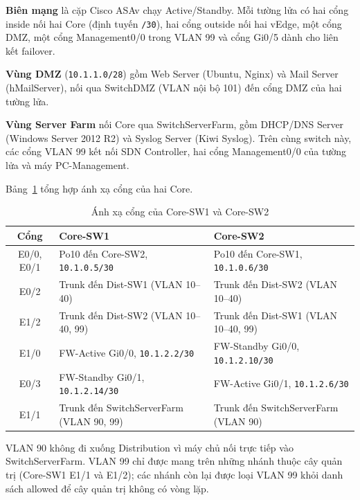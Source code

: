 \textbf{Biên mạng} là cặp Cisco ASAv chạy Active/Standby. Mỗi tường lửa có hai cổng inside nối hai Core (định tuyến \texttt{/30}), hai cổng outside nối hai vEdge, một cổng DMZ, một cổng Management0/0 trong VLAN 99 và cổng Gi0/5 dành cho liên kết failover.

\textbf{Vùng DMZ} (\texttt{10.1.1.0/28}) gồm Web Server (Ubuntu, Nginx) và Mail Server (hMailServer), nối qua SwitchDMZ (VLAN nội bộ 101) đến cổng DMZ của hai tường lửa.

\textbf{Vùng Server Farm} nối Core qua SwitchServerFarm, gồm DHCP/DNS Server (Windows Server 2012 R2) và Syslog Server (Kiwi Syslog). Trên cùng switch này, các cổng VLAN 99 kết nối SDN Controller, hai cổng Management0/0 của tường lửa và máy PC-Management.

Bảng~\ref{tab:cong_core_site100} tổng hợp ánh xạ cổng của hai Core.

\begin{table}[H]
    \centering
    \small
    \caption{Ánh xạ cổng của Core-SW1 và Core-SW2}
    \label{tab:cong_core_site100}
    \begin{tabularx}{\textwidth}{|c|X|X|}
        \hline
        \textbf{Cổng} & \textbf{Core-SW1} & \textbf{Core-SW2} \\
        \hline
        E0/0, E0/1 & Po10 đến Core-SW2, \texttt{10.1.0.5/30} & Po10 đến Core-SW1, \texttt{10.1.0.6/30} \\
        \hline
        E0/2 & Trunk đến Dist-SW1 (VLAN 10--40) & Trunk đến Dist-SW2 (VLAN 10--40) \\
        \hline
        E1/2 & Trunk đến Dist-SW2 (VLAN 10--40, 99) & Trunk đến Dist-SW1 (VLAN 10--40, 99) \\
        \hline
        E1/0 & FW-Active Gi0/0, \texttt{10.1.2.2/30} & FW-Standby Gi0/0, \texttt{10.1.2.10/30} \\
        \hline
        E0/3 & FW-Standby Gi0/1, \texttt{10.1.2.14/30} & FW-Active Gi0/1, \texttt{10.1.2.6/30} \\
        \hline
        E1/1 & Trunk đến SwitchServerFarm (VLAN 90, 99) & Trunk đến SwitchServerFarm (VLAN 90) \\
        \hline
    \end{tabularx}
\end{table}

VLAN 90 không đi xuống Distribution vì máy chủ nối trực tiếp vào SwitchServerFarm. VLAN 99 chỉ được mang trên những nhánh thuộc cây quản trị (Core-SW1 E1/1 và E1/2); các nhánh còn lại được loại VLAN 99 khỏi danh sách allowed để cây quản trị không có vòng lặp.

